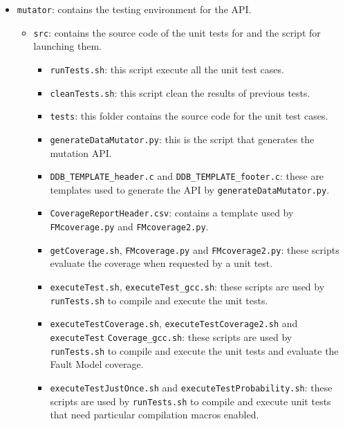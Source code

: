 \begin{itemize}
{\begin{itemize}
\begin{itemize}
\begin{itemize}
			\item \texttt{test\_files}: this folder contains the necessary files for executing the test cases.
		\end{itemize}
		\ENDCHANGEDFR
	\end{itemize}%
	\item \texttt{mutator}: contains the testing environment for the \DAMA API.
	\begin{itemize}%
		\item \texttt{src}: contains the source code of the unit tests for \DAMA and the script for launching them.
		\begin{itemize}%
			\item \texttt{runTests.sh}: this script execute all the unit test cases.
			\item \texttt{cleanTests.sh}: this script clean the results of previous tests.
			\item \texttt{tests}: this folder contains the source code for the unit test cases.
			\item \texttt{generateDataMutator.py}: this is the script that generates the \DAMA mutation API.
			\item \texttt{DDB\_TEMPLATE\_header.c} and \texttt{DDB\_TEMPLATE\_footer.c}: these are templates used to generate the \DAMA API by \texttt{generateDataMutator.py}.
			\item \texttt{CoverageReportHeader.csv}: contains a template used by \texttt{FMcoverage.py} and \texttt{FMcoverage2.py}.
			\item \texttt{getCoverage.sh}, \texttt{FMcoverage.py} and \texttt{FMcoverage2.py}: these scripts evaluate the coverage when requested by a unit test.
			\item \texttt{executeTest.sh}, \texttt{executeTest\_gcc.sh}: these scripts are used by \texttt{runTests.sh} to compile and execute the unit tests.
			\item \texttt{executeTestCoverage.sh}, \texttt{executeTestCoverage2.sh} and  \texttt{execute}\texttt{Test}
			\texttt{Coverage}\texttt{\_gcc.sh}: these scripts are used by \texttt{runTests.sh} to compile and execute the unit tests and evaluate the Fault Model coverage.
			\item \texttt{executeTestJustOnce.sh} and \texttt{executeTestProbability.sh}: these scripts are used by \texttt{runTests.sh} to compile and execute unit tests that need particular compilation macros enabled.
		\end{itemize}%
	\end{itemize}%
\end{itemize}%
}



\end{itemize}

